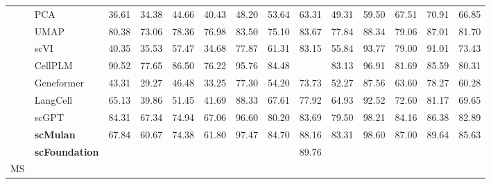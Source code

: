 \begin{table}[htbp]
\begin{tabular}{llcccccccccccc}
      & PCA      &   36.61 &   34.38 &   44.66 &   40.43 &   48.20 &   53.64 &   63.31 &   49.31 &   59.50 &   67.51 &   70.91 &   66.85  \\
      & UMAP      &   80.38 &   73.06 &   78.36 &   76.98 &   83.50 &   75.10 &   83.67 &   77.84 &   88.34 &   79.06 &   87.01 &   81.70  \\
      & scVI      &   40.35 &   35.53 &   57.47 &   34.68 &   77.87 &   61.31 &   83.15 &   55.84 &   93.77 &   79.00 &   91.01 &   73.43  \\
      & CellPLM      &   90.52 &   77.65 &   86.50 &   76.22 &   95.76 &   84.48 & \cellcolor{gray!25}{90.15} &   83.13 &   96.91 &   81.69 &   85.59 &   80.31  \\
      & Geneformer      &   43.31 &   29.27 &   46.48 &   33.25 &   77.30 &   54.20 &   73.73 &   52.27 &   87.56 &   63.60 &   78.27 &   60.28  \\
      & LangCell      &   65.13 &   39.86 &   51.45 &   41.69 &   88.33 &   67.61 &   77.92 &   64.93 &   92.52 &   72.60 &   81.17 &   69.65  \\
      & scGPT      &   84.31 &   67.34 &   74.94 &   67.06 &   96.60 &   80.20 &   83.69 &   79.50 &   98.21 &   84.16 &   86.38 &   82.89  \\
      & \cellcolor{gray!25}\textbf{scMulan}      &   67.84 &   60.67 &   74.38 &   61.80 &   97.47 &   84.70 &   88.16 &   83.31 &   98.60 &   87.00 &   89.64 &   85.63  \\
      & \cellcolor{gray!25}\textbf{scFoundation}      & \cellcolor{gray!25}{98.03} & \cellcolor{gray!25}{85.27} & \cellcolor{gray!25}{87.76} & \cellcolor{gray!25}{84.50} & \cellcolor{gray!25}{97.84} & \cellcolor{gray!25}{88.75} &   89.76 & \cellcolor{gray!25}{88.51} & \cellcolor{gray!25}{98.87} & \cellcolor{gray!25}{92.04} & \cellcolor{gray!25}{92.38} & \cellcolor{gray!25}{92.20}  \\
    \midrule

    \multirow{9}{*}{MS}


\end{tabular}
\end{table}
